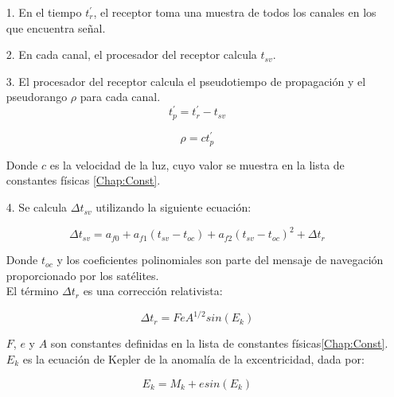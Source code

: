 \begin{itemize}
\item[1.] En el tiempo $t^{'}_r$, el receptor toma una muestra de todos los canales en los que encuentra señal.\\

\item[2.] En cada canal, el procesador del receptor calcula $t_{sv}$.\\

\item[3.] El procesador del receptor calcula el pseudotiempo de propagación y el pseudorango $\rho$ para cada canal.\\

\begin{equation}
\label{Eq:t'_p}
t^{'}_p = t^{'}_r - t_{sv}
\end{equation}

\begin{equation}
\label{Eq:rho}
\rho = ct^{'}_p
\end{equation}

Donde $c$ es la velocidad de la luz, cuyo valor se muestra en la lista de constantes físicas \ref{Chap:Const}.

\item[4.] Se calcula $\Delta t_{sv}$ utilizando la siguiente ecuación:

\begin{equation}
\label{Eq:Deltat_sv}
\Delta t_{sv}= a_{f0} + a_{f1}(t_{sv}-t_{oc}) + a_{f2}(t_{sv}-t_{oc})^2 + \Delta t_{r}
\end{equation}

Donde $t_{oc}$ y los coeficientes polinomiales son parte del mensaje de navegación proporcionado por los satélites.\\

El término $\Delta t_{r}$ es una corrección relativista:

\begin{equation}
\label{Eq:Deltat_r}
\Delta t_r = FeA^{1/2}sin(E_{k})
\end{equation}

$F$, $e$ y $A$ son constantes definidas en la lista de constantes físicas\ref{Chap:Const}.\\

$E_{k}$ es la ecuación de Kepler de la anomalía de la excentricidad, dada por:

\begin{equation}
\label{Eq:Kepler}
E_k = M_k + esin(E_k)
\end{equation}


\end{itemize}
